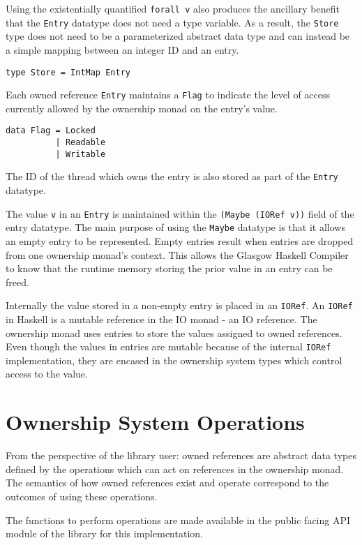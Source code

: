 \documentclass[onehalf,11pt]{beavtex}
\begin{document}
Using the existentially quantified \texttt{forall v} also produces the
ancillary benefit that the \texttt{Entry} datatype does not need a type
variable.
As a result, the \texttt{Store} type does not need to be a parameterized abstract
data type and can instead be a simple mapping between an integer ID and an entry.

\begin{verbatim}
type Store = IntMap Entry
\end{verbatim}

Each owned reference \texttt{Entry} maintains a \texttt{Flag} to indicate the
level of access currently allowed by the ownership monad on the entry's value.

\begin{verbatim}
data Flag = Locked
          | Readable
          | Writable
\end{verbatim}

The ID of the thread which owns the entry is also stored as part of the
\texttt{Entry} datatype. 

The value \texttt{v} in an \texttt{Entry} is maintained within the
\texttt{(Maybe (IORef v))} field of the entry datatype.
The main purpose of using the \texttt{Maybe} datatype is that it allows an empty
entry to be represented.
Empty entries result when entries are dropped from one ownership monad's
context.  This allows the Glasgow Haskell Compiler to know that
the runtime memory storing the prior value in an entry can be freed.

Internally the value stored in a non-empty entry is placed in an \texttt{IORef}.
An \texttt{IORef} in Haskell is a mutable reference in the IO monad - an IO
reference.
The ownership monad uses entries to store the values assigned to owned
references.
Even though the values in entries are mutable because of the internal
\texttt{IORef} implementation, they are encased in the ownership system types
which control access to the value.

\section{Ownership System Operations}

From the perspective of the library user: owned references are abstract
data types defined by the operations which can act on references in the
ownership monad.
The semantics of how owned references exist and operate correspond to the
outcomes of using these operations.

The functions to perform operations are made available in the public facing API
module of the library for this implementation.
\end{document}
